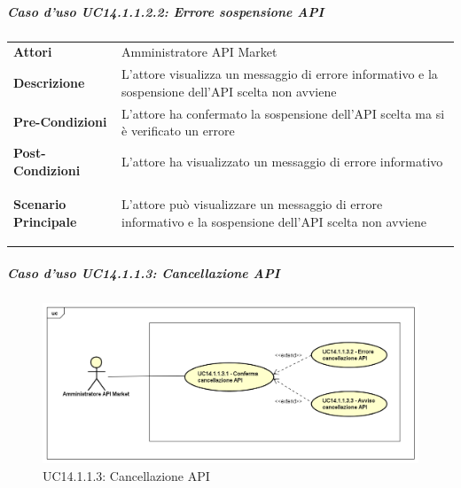 \subparagraph{Caso d'uso UC14.1.1.2.2: Errore sospensione API}
\label{UC14_1_1_2_2}

\begin{minipage}{\linewidth}
	\begin{tabular}{ l | p{11cm}}
		\hline
		\rowcolor{Gray}
		\multicolumn{2}{c}{UC14.1.1.2.2 - Errore sospensione API} \\
		\hline
		\textbf{Attori} & Amministratore API Market \\
		\textbf{Descrizione} & L'attore visualizza un messaggio di errore informativo e la sospensione dell'API scelta non avviene \\
		\textbf{Pre-Condizioni} & L'attore ha confermato la sospensione dell'API scelta ma si è verificato un errore \\
		\textbf{Post-Condizioni} & L'attore ha visualizzato un messaggio di errore informativo \\
		\textbf{Scenario Principale} & 
		\begin{enumerate*}[label=(\arabic*.),itemjoin={\newline}]
			\item L'attore può visualizzare un messaggio di errore informativo e la sospensione dell'API scelta non avviene
		\end{enumerate*}\\
	\end{tabular}
\end{minipage}

\newpage
\subparagraph{Caso d'uso UC14.1.1.3: Cancellazione API}
\label{UC14_1_1_3}
\begin{figure}[ht]
	\centering
	\includegraphics[scale=0.45]{UML/UC14_1_1_3.png}
	\caption{UC14.1.1.3: Cancellazione API}
\end{figure}

